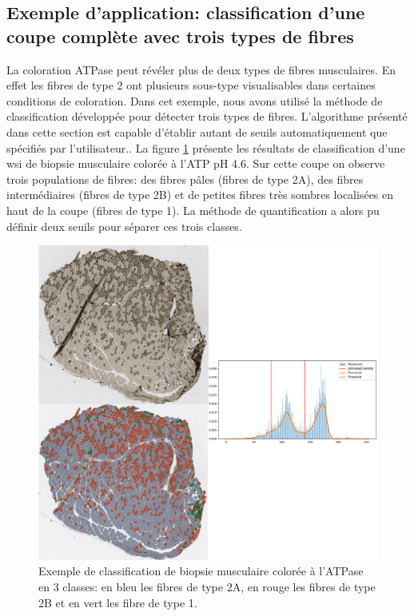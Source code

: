 \subsection{Exemple d'application: classification d'une coupe complète avec trois types de fibres}
La coloration ATPase peut révéler plus de deux types de fibres musculaires. En effet les fibres de type 2 ont plusieurs sous-type visualisables dans certaines conditions de coloration. Dans cet exemple, nous avons utilisé la méthode de classification développée pour détecter trois types de fibres. L'algorithme présenté dans cette section est capable d'établir autant de seuils automatiquement que spécifiés par l'utilisateur.. La figure \ref{fig:atp_paint_wsi} présente les résultats de classification d'une \gls{wsi} de biopsie musculaire colorée à l'ATP pH 4.6. Sur cette coupe on observe trois populations de fibres: des fibres pâles (fibres de type 2A), des fibres intermédiaires (fibres de type 2B) et de petites fibres très sombres localisées en haut de la coupe (fibres de type 1). La méthode de quantification a alors pu définir deux seuils pour séparer ces trois classes. 
\begin{figure}[htbp]
 \centering
 \includegraphics[width=1\textwidth]{figures/atp_wsi.png}
 \caption[Exemple de classification de biopsie musculaire colorée à l'ATPase]{Exemple de classification de biopsie musculaire colorée à l'ATPase en 3 classes: en bleu les fibres de type 2A, en rouge les fibres de type 2B et en vert les fibre de type 1.}
 \label{fig:atp_paint_wsi}
\end{figure}


